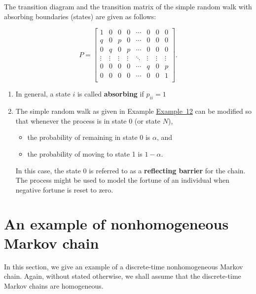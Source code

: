 \documentclass[
]{book}
\theoremstyle{definition}
\theoremstyle{definition}
\theoremstyle{definition}
\theoremstyle{definition}
\theoremstyle{remark}
\begin{document}
The transition diagram and the transition matrix of the simple random
walk with absorbing boundaries (states) are given as follows:

\[P = \begin{bmatrix}
    1& 0 & 0 & 0& \cdots & 0& 0  & 0    \\
    q & 0 & p  & 0& \cdots & 0& 0  & 0  \\
    0 & q & 0 & p  & \cdots & 0& 0 & 0   \\
    \vdots & \vdots & \vdots & \vdots &  \ddots & \vdots    & \vdots & \vdots   \\
    0 & 0 & 0 & 0  & \cdots & q & 0 & p   \\
    0 & 0 & 0 & 0  & \cdots & 0 & 0 & 1   \\
\end{bmatrix}.\]

\begin{enumerate}
\def\labelenumi{\arabic{enumi}.}
\item
  In general, a state \(i\) is called \textbf{absorbing} if \(p_{ii} = 1\)
\item
  The simple random walk as given in Example
  \protect\hyperlink{simpleRW}{Example~12}
  can be modified so that whenever the process is in state 0 (or state
  \(N\)),

  \begin{itemize}
  \item
    the probability of remaining in state 0 is \(\alpha\), and
  \item
    the probability of moving to state 1 is \(1 - \alpha\).
  \end{itemize}

  In this case, the state 0 is referred to as a \textbf{reflecting barrier}
  for the chain. The process might be used to model the fortune of an
  individual when negative fortune is reset to zero.
\end{enumerate}

\hypertarget{an-example-of-nonhomogeneous-markov-chain}{%
\section{An example of nonhomogeneous Markov chain}\label{an-example-of-nonhomogeneous-markov-chain}}

In this section, we give an example of a discrete-time nonhomogeneous
Markov chain. Again, without stated otherwise, we shall assume that the
discrete-time Markov chains are homogeneous.
\end{document}
